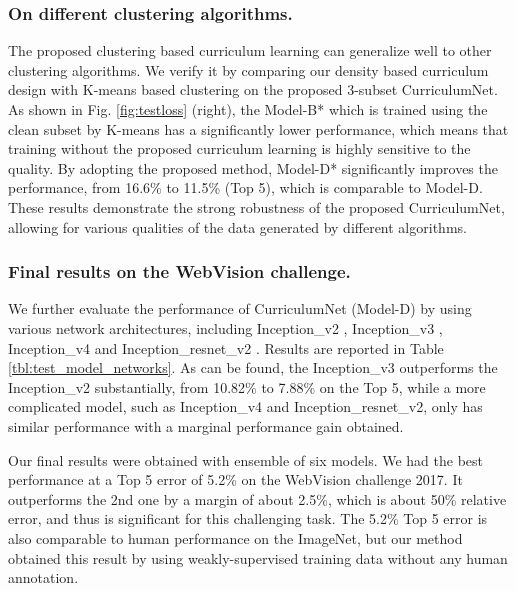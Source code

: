 \documentclass[runningheads]{llncs}
\begin{document}
\subsubsection{On different clustering algorithms.}
The proposed clustering based curriculum learning can generalize well to other clustering algorithms. We verify it by comparing our density based curriculum design with K-means based clustering on the proposed 3-subset CurriculumNet. As shown in Fig. \ref{fig:testloss} (right), the Model-B* which is trained using the clean subset by K-means has a significantly lower performance, which means that training without the proposed curriculum learning is highly sensitive to the quality. By adopting the proposed method, Model-D* significantly improves the performance, from 16.6\% to 11.5\% (Top 5), which is comparable to Model-D. These results demonstrate the strong robustness of the proposed CurriculumNet, allowing for various qualities of the data generated by different algorithms.





\subsubsection{Final results on the WebVision challenge.}
We further evaluate the performance of CurriculumNet (Model-D) by using various network architectures, including Inception\_v2 \cite{ioffe2015batch}, Inception\_v3 \cite{szegedy2016rethinking}, Inception\_v4 \cite{szegedy2017inception} and Inception\_resnet\_v2 \cite{szegedy2017inception}. Results are reported in Table \ref{tbl:test_model_networks}.  As can be found, the Inception\_v3 outperforms the Inception\_v2 substantially, from  10.82\% to 7.88\% on the Top 5, while a more complicated model, such as Inception\_v4  and Inception\_resnet\_v2, only has similar performance with a marginal performance gain obtained.

Our final results were obtained with ensemble of six models. We had the best performance at a Top 5 error of 5.2\% on the WebVision challenge 2017\cite{li2017webvision}. It outperforms the 2nd one by a margin of about 2.5\%, which is about 50\% relative error, and thus is significant for this challenging task. The 5.2\% Top 5 error is also comparable to human performance on the ImageNet, but our method obtained this result by using weakly-supervised training data without any human annotation.
\end{document}
